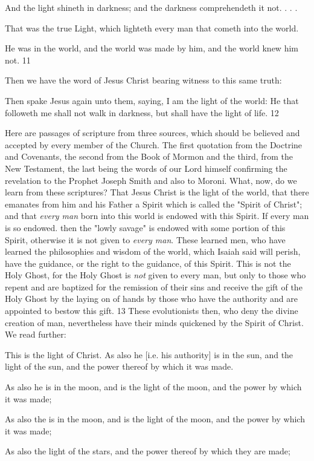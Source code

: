 And the light shineth in darkness; and the darkness comprehendeth it not. . . .

That was the true Light, which lighteth every man that cometh into the world.

He was in the world, and the world was made by him, and the world knew him not. 11

Then we have the word of Jesus Christ bearing witness to this same truth:

Then spake Jesus again unto them, saying, I am the light of the world: He that followeth me
shall not walk in darkness, but shall have the light of life. 12

Here are passages of scripture from three sources, which should be believed and accepted by
every member of the Church. The first quotation from the Doctrine and Covenants, the
second from the Book of Mormon and the third, from the New Testament, the last being the
words of our Lord himself confirming the revelation to the Prophet Joseph Smith and also to
Moroni. What, now, do we learn from these scriptures? That Jesus Christ is the light of the
world, that there emanates from him and his Father a Spirit which is called the "Spirit of
Christ"; and that \textit{every man} born into this world is endowed with this Spirit. If every man is
so endowed. then the "lowly savage" is endowed with some portion of this Spirit, otherwise
it is not given to \textit{every man}. These learned men, who have learned the philosophies and
wisdom of the world, which Isaiah said will perish, have the guidance, or the right to the
guidance, of this Spirit. This is not the Holy Ghost, for the Holy Ghost is \textit{not} given to every
man, but only to those who repent and are baptized for the remission of their sins and receive
the gift of the Holy Ghost by the laying on of hands by those who have the authority and are
appointed to bestow this gift. 13 These evolutionists then, who deny the divine creation of
man, nevertheless have their minds quickened by the Spirit of Christ. We read further:

This is the light of Christ. As also he [i.e. his authority] is in the sun, and the light of the sun,
and the power thereof by which it was made.

As also he is in the moon, and is the light of the moon, and the power by which it was made;

As also the is in the moon, and is the light of the moon, and the power by which it was made;

As also the light of the stars, and the power thereof by which they are made;

